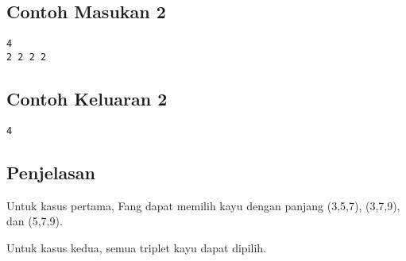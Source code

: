 \documentclass{article}
\begin{document}
\begin{multicols}{2}
\subsection*{Contoh Masukan 2}
\begin{lstlisting}
4
2 2 2 2
\end{lstlisting}
\columnbreak
\subsection*{Contoh Keluaran 2}
\begin{lstlisting}
4
\end{lstlisting}
\vfill
\null
\end{multicols}

\subsection*{Penjelasan}
Untuk kasus pertama, Fang dapat memilih kayu dengan panjang (3,5,7), (3,7,9), dan (5,7,9).

Untuk kasus kedua, semua triplet kayu dapat dipilih.

\pagebreak
\end{document}
